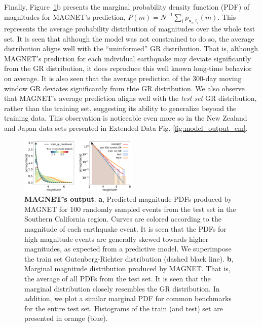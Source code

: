 \documentclass[pdflatex]{sn-jnl}
\begin{document}
Finally, Figure~\ref{fig:model_output}b presents the marginal probability density function (PDF) of magnitudes for MAGNET's prediction, $P(m)=N^{-1}\sum_i p_{\textbf{x}_i, t_i}(m)$. This represents the average probability distribution of magnitudes over the whole test set. It is seen that although the model was not constrained to do so, the average distribution aligns well with the ``uninformed'' GR distribution. That is, although MAGNET's prediction for each individual earthquake may deviate significantly from the GR distribution, it does reproduce this well known long-time behavior on average. It is also seen that the average prediction of the 300-day moving window GR deviates significantly from thte GR distribution. We also observe that MAGNET's average prediction aligns well with the \emph{test set} GR distribution, rather than the training set, suggesting its ability to generalize beyond the training data. This observation is noticeable even more so in the New Zealand and Japan data sets presented in Extended Data Fig. \ref{fig:model_output_em}.

\begin{figure}[h!]
    \centering
    \includegraphics[width=0.5\textwidth]{figures/raw_results.pdf}
    \caption{
        \textbf{MAGNET's output}. \textbf{a}, Predicted magnitude PDFs produced by MAGNET for 100 randomly sampled events from the test set in the Southern California region. Curves are colored according to the magnitude of each earthquake event. It is seen that the PDFs for high magnitude events are generally skewed towards higher magnitudes, as expected from a predictive model. We superimpose the train set Gutenberg-Richter distribution (dashed black line).  \textbf{b}, Marginal magnitude distribution produced by MAGNET. That is, the average of all PDFs from the test set. It is seen that the marginal distribution closely resembles the GR distribution. In addition, we plot a similar marginal PDF for common benchmarks for the entire test set. Histograms of the train (and test) set are presented in orange (blue).
    }
    \label{fig:model_output}
\end{figure}
\end{document}
